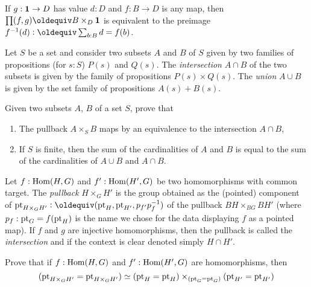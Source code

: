 \begin{example}
  If $g:\mathbf{1}\to D$ has value $d:D$ and $f:B\to D$ is any map, then $\prod(f,g)\oldequiv B\times_D\bn 1$ is equivalent to the preimage $f^{-1}(d)\defequi\sum_{b:B}d=f(b)$.
\end{example}


\begin{definition}
  \label{def:intersectionand unionofsets}
  Let $S$ be a set and consider two subsets $A$ and $B$ of $S$ given by two families of propositions (for $s:S$) $P(s)$ and $Q(s)$.  The \emph{intersection} $A\cap B$ of the two subsets is given by the family of propositions $P(s)\times Q(s)$.  The \emph{union} $A\cup B$ is given by the set family of propositions $A(s)+B(s)$.  
\end{definition}
\begin{xca}
  \label{xca:intersectionpullbackofsets}
  Given two subsets $A$, $B$ of a set $S$, prove that
  \begin{enumerate}
  \item The pullback $A\times_SB$ maps by an equivalence to the intersection $A\cap B$,
  \item\label{xca:cardinalityintersectionunion} 
    If $S$ is finite, then the sum of the cardinalities of $A$ and $B$ is equal to the sum of the cardinalities of $A\cup B$ and $A\cap B$.
  \end{enumerate}
\end{xca}

\begin{definition}
  \label{def:intersectionofgroups}
  Let $f:\mathrm{Hom}(H,G)$ and $f':\mathrm{Hom}(H',G)$ be two homomorphisms with common target.  The \emph{pullback} $H\times_GH'$ is the group obtained as the (pointed) component of $\pt_{H\times_GH'}\defequi(\pt_H,\pt_{H'},p_{f'}p_f^{-1})$ of the pullback $BH\times_{BG}BH'$ (where $p_f:{\mathord{\mathrm{pt}}}_G=f({\mathord{\mathrm{pt}}}_H)$ is the name we chose for the data displaying $f$ as a pointed map).
If $f$ and $g$ are injective homomorphisms, then the pullback is called the \emph{intersection} and if the context is clear denoted simply $H\cap H'$.
\end{definition}
\begin{xca}
  Prove that if $f:\mathrm{Hom}(H,G)$ and $f':\mathrm{Hom}(H',G)$ are homomorphisms, then
$$({\mathord{\mathrm{pt}}}_{H\times_GH'}={\mathord{\mathrm{pt}}}_{H\times_GH'})\simeq ({\mathord{\mathrm{pt}}}_{H}={\mathord{\mathrm{pt}}}_{H})\times_{({\mathord{\mathrm{pt}}}_{G}={\mathord{\mathrm{pt}}}_{G})}({\mathord{\mathrm{pt}}}_{H'}={\mathord{\mathrm{pt}}}_{H'})
$$
\end{xca}

